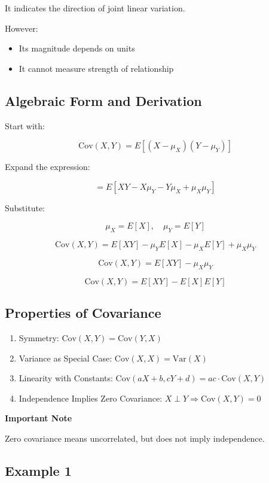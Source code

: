 \documentclass[12pt]{article}
\begin{document}
It indicates the direction of joint linear variation.

However:

\begin{itemize}
\item Its magnitude depends on units
\item It cannot measure strength of relationship
\end{itemize}

\subsection{Algebraic Form and Derivation}

Start with:

\[
\text{Cov}(X, Y) = E[(X - \mu_X)(Y - \mu_Y)]
\]

Expand the expression:

\[
= E[XY - X\mu_Y - Y\mu_X + \mu_X \mu_Y]
\]

Substitute:

\[
\mu_X = E[X], \quad \mu_Y = E[Y]
\]

\[
\text{Cov}(X, Y) = E[XY] - \mu_Y E[X] - \mu_X E[Y] + \mu_X \mu_Y
\]

\[
\text{Cov}(X, Y) = E[XY] - \mu_X \mu_Y
\]

\[
\text{Cov}(X, Y) = E[XY] - E[X]E[Y]
\]

\subsection{Properties of Covariance}

\begin{enumerate}
\item Symmetry: $\text{Cov}(X, Y) = \text{Cov}(Y, X)$
\item Variance as Special Case: $\text{Cov}(X, X) = \text{Var}(X)$
\item Linearity with Constants: $\text{Cov}(aX + b, cY + d) = ac \cdot \text{Cov}(X, Y)$
\item Independence Implies Zero Covariance: $X \perp Y \Rightarrow \text{Cov}(X, Y) = 0$
\end{enumerate}

\textbf{Important Note}

Zero covariance means uncorrelated, but does not imply independence.

\subsection{Example 1}
\end{document}
